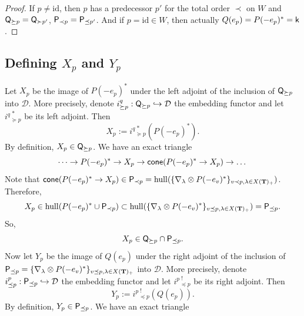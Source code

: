 \documentclass[sn-mathphys-num]{sn-jnl}%
\newcommand{\D}{\mathcal D}
\newcommand{\subsetq}{\subset}
\newcommand{\hull}{{\mathrm{hull}}}
\newcommand{\id}{{\mathrm{id}}}
\newcommand{\sk}{{\sf k}}
\newcommand{\bt}{\mathbf T}
\theoremstyle{definition}
\begin{document}
\begin{proof}
    If $p\neq\id$, then $p$ has a predecessor $p'$ for the total order $\prec$ on $W$ and ${\sf Q}_{\succeq p}={\sf Q}_{\succ p'}$,
    ${\sf P}_{\prec p}={\sf P}_{\preceq p'}$.
    And if $p=\id\in W$, then actually $Q(e_p)=P(-e_p)^*=\sk$.
\end{proof}
\subsection{Defining $X_p$ and $Y_p$}\label{subsec:X_p-Y_p}


Let $X_p$ be the image of $P(-e_p)^*$ under the left adjoint of the inclusion of ${\sf Q}_{\succeq p}$ into $\D$.
More precisely, denote $i^q_{\succeq p}:{\sf Q}_{\succeq p}\hookrightarrow \D$ the embedding functor and let ${i^q}_{\succeq p}^{\ \ast}$ be its left adjoint. Then
\begin{equation}\label{eq:def_of_X_p}
X_p:={i^q}_{\succeq p}^{\ \ast}(P(-e_p)^*).
\end{equation}
By definition, $X_p\in {\sf Q}_{\succeq p}$. 
We have an exact triangle 
\begin{equation}\label{eq:def_triang_X_p}
\dots \rightarrow P(-e_p)^*\rightarrow X_p\rightarrow {\sf cone}(P(-e_p)^*\rightarrow X_p)\rightarrow \dots 
\end{equation}
Note that ${\sf cone}(P(-e_p)^*\rightarrow X_p)\in{\sf P}_{\prec p}=\hull(\{\nabla_\lambda\otimes P(-e_v)^*\}_{v\prec  p,\lambda\in X( \bt)_+})$. Therefore, 
$$X_p\in\hull(  P(-e_p)^*\cup {\sf P}_{\prec p})\subsetq\hull(\{\nabla_\lambda\otimes P(-e_v)^*\}_{v\preceq  p,\lambda\in X( \bt)_+})={\sf P}_{\preceq p}.$$
So, 
\begin{equation}\label{eq:X in Q and P}
X_p\in {\sf Q}_{\succeq p}\cap {\sf P}_{\preceq p}.    
\end{equation}
Now let $Y_p$ be the image of $Q(e_p)$ under the 
right adjoint of the inclusion of
${\sf P}_{\preceq p}=\{\nabla_\lambda\otimes P(-e_v)^*\}_{v\preceq p,\lambda\in X( \bt)_+}$ into $\D$. More precisely, denote $i^p_{\preceq  p}:{\sf P}_{\preceq p}\hookrightarrow \D$ the embedding functor and let ${i^p}_{\preceq p}^{\ !}$ be its right adjoint. Then
\begin{equation}\label{eq:def_of_Y_p}
Y_p:={i^p}_{\preceq p}^{\ !}(Q(e_p)).
\end{equation}
By definition, $Y_p\in {\sf P}_{\preceq p}$. We have an exact triangle 
\end{document}
